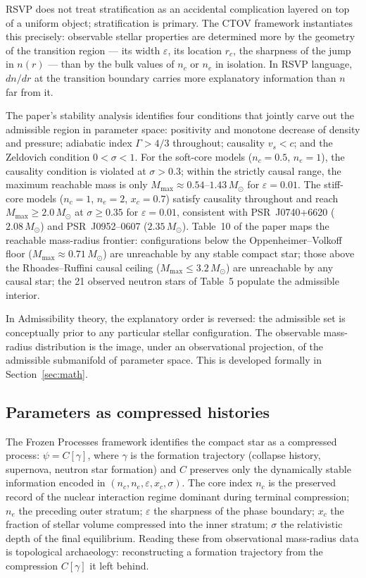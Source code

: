 \documentclass[12pt, oneside]{article}
\begin{document}
RSVP does not treat stratification as an accidental complication layered on top of a uniform object; stratification is primary. The CTOV framework instantiates this precisely: observable stellar properties are determined more by the geometry of the transition region --- its width $\varepsilon$, its location $r_c$, the sharpness of the jump in $n(r)$ --- than by the bulk values of $n_c$ or $n_e$ in isolation. In RSVP language, $dn/dr$ at the transition boundary carries more explanatory information than $n$ far from it.

The paper's stability analysis identifies four conditions that jointly carve out the admissible region in parameter space: positivity and monotone decrease of density and pressure; adiabatic index $\Gamma > 4/3$ throughout; causality $v_s < c$; and the Zeldovich condition $0 < \sigma < 1$. For the soft-core models ($n_c = 0.5$, $n_e = 1$), the causality condition is violated at $\sigma > 0.3$; within the strictly causal range, the maximum reachable mass is only $M_{\text{max}} \approx 0.54$--$1.43\,M_\odot$ for $\varepsilon = 0.01$. The stiff-core models ($n_c = 1$, $n_e = 2$, $x_c = 0.7$) satisfy causality throughout and reach $M_{\text{max}} \geq 2.0\,M_\odot$ at $\sigma \geq 0.35$ for $\varepsilon = 0.01$, consistent with PSR~J0740+6620 ($2.08\,M_\odot$) and PSR~J0952--0607 ($2.35\,M_\odot$). Table~10 of the paper maps the reachable mass-radius frontier: configurations below the Oppenheimer--Volkoff floor ($M_{\text{max}} \approx 0.71\,M_\odot$) are unreachable by any stable compact star; those above the Rhoades--Ruffini causal ceiling ($M_{\text{max}} \leq 3.2\,M_\odot$) are unreachable by any causal star; the 21 observed neutron stars of Table~5 populate the admissible interior.

In Admissibility theory, the explanatory order is reversed: the admissible set is conceptually prior to any particular stellar configuration. The observable mass-radius distribution is the image, under an observational projection, of the admissible submanifold of parameter space. This is developed formally in Section~\ref{sec:math}.

\subsection{Parameters as compressed histories}

The Frozen Processes framework identifies the compact star as a compressed process: $\psi = C[\gamma]$, where $\gamma$ is the formation trajectory (collapse history, supernova, neutron star formation) and $C$ preserves only the dynamically stable information encoded in $(n_c, n_e, \varepsilon, x_c, \sigma)$. The core index $n_c$ is the preserved record of the nuclear interaction regime dominant during terminal compression; $n_e$ the preceding outer stratum; $\varepsilon$ the sharpness of the phase boundary; $x_c$ the fraction of stellar volume compressed into the inner stratum; $\sigma$ the relativistic depth of the final equilibrium. Reading these from observational mass-radius data is topological archaeology: reconstructing a formation trajectory from the compression $C[\gamma]$ it left behind.
\end{document}
